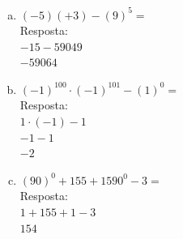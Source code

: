 \documentclass[a4paper,14pt]{article}
\begin{document}
\begin{multicols}{2}
\begin{enumerate}
\begin{enumerate}[a)]
				\item $(-5)(+3)-(9)^5 = $ \\
				
				Resposta: \\ 
				
				$-15 - 59049$ \\
				$-59064$ \\
				
				\item $(-1)^{100} \cdot (-1)^{101} -(1)^0 = $ \\
				
				Resposta: \\
				
				$1 \cdot (-1) - 1$ \\
				$-1 - 1$ \\
				$-2$ \\
				
				\item $(90)^0 + 155 + 1590^0 - 3 = $ \\
				
				Resposta: \\
				
				$1 + 155 + 1 - 3$ \\
				$154$ \\
			\end{enumerate}
        \end{enumerate}
    $~$ \\ $~$ \\ $~$ \\ $~$ \\ $~$ \\ $~$ \\ $~$
    \end{multicols}
\end{document}
